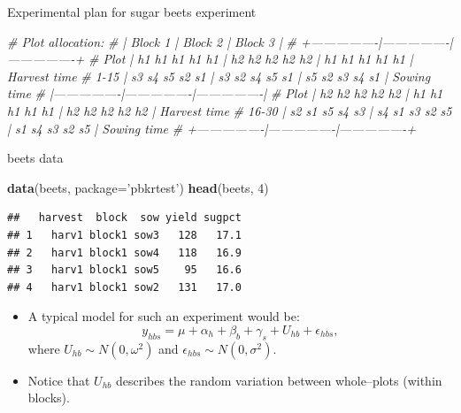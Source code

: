\documentclass[
  ignorenonframetext,
]{beamer}
\newenvironment{Shaded}{\begin{snugshade}}{\end{snugshade}}
\newcommand{\CommentTok}[1]{\textcolor[rgb]{0.56,0.35,0.01}{\textit{#1}}}
\newcommand{\DataTypeTok}[1]{\textcolor[rgb]{0.13,0.29,0.53}{#1}}
\newcommand{\DecValTok}[1]{\textcolor[rgb]{0.00,0.00,0.81}{#1}}
\newcommand{\KeywordTok}[1]{\textcolor[rgb]{0.13,0.29,0.53}{\textbf{#1}}}
\newcommand{\NormalTok}[1]{#1}
\newcommand{\StringTok}[1]{\textcolor[rgb]{0.31,0.60,0.02}{#1}}
\begin{document}
\begin{frame}[fragile]

Experimental plan for sugar beets experiment

\scriptsize

\begin{Shaded}
\begin{Highlighting}[]
\CommentTok{# Plot allocation:}
\CommentTok{#       |  Block 1       |  Block 2       |  Block 3       |}
\CommentTok{#       +----------------|----------------|----------------+}
\CommentTok{# Plot  | h1 h1 h1 h1 h1 | h2 h2 h2 h2 h2 | h1 h1 h1 h1 h1 | Harvest time}
\CommentTok{# 1-15  | s3 s4 s5 s2 s1 | s3 s2 s4 s5 s1 | s5 s2 s3 s4 s1 | Sowing time}
\CommentTok{#       |----------------|----------------|----------------|}
\CommentTok{# Plot  | h2 h2 h2 h2 h2 | h1 h1 h1 h1 h1 | h2 h2 h2 h2 h2 | Harvest time}
\CommentTok{# 16-30 | s2 s1 s5 s4 s3 | s4 s1 s3 s2 s5 | s1 s4 s3 s2 s5 | Sowing time}
\CommentTok{#       +----------------|----------------|----------------+}
\end{Highlighting}
\end{Shaded}

\normalsize

\end{frame}

\begin{frame}[fragile]

\begin{block}{beets data}

\small

\begin{Shaded}
\begin{Highlighting}[]
\KeywordTok{data}\NormalTok{(beets, }\DataTypeTok{package=}\StringTok{'pbkrtest'}\NormalTok{)}
\KeywordTok{head}\NormalTok{(beets, }\DecValTok{4}\NormalTok{)}
\end{Highlighting}
\end{Shaded}

\begin{verbatim}
##   harvest  block  sow yield sugpct
## 1   harv1 block1 sow3   128   17.1
## 2   harv1 block1 sow4   118   16.9
## 3   harv1 block1 sow5    95   16.6
## 4   harv1 block1 sow2   131   17.0
\end{verbatim}

\normalsize

\begin{itemize}
\item
  A typical model for such an experiment would be: \begin{equation}
      \label{eq:beetsmodel1}
      y_{hbs} = \mu + \alpha_h + \beta_b + \gamma_s + U_{hb} + \epsilon_{hbs},
    \end{equation} where \(U_{hb} \sim N(0,\omega^2)\) and
  \(\epsilon_{hbs}\sim  N(0,\sigma^2)\).
\item
  Notice that \(U_{hb}\) describes the random variation between
  whole--plots (within blocks).
\end{itemize}

\end{block}

\end{frame}
\end{document}
